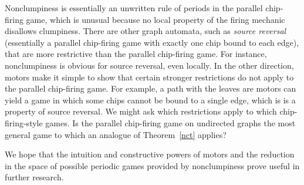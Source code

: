 Nonclumpiness is essentially an unwritten rule of periods in the parallel
chip-firing game, which is unusual because no local property of the firing
mechanic disallows clumpiness. There are other graph automata, such as
\emph{source reversal}~\cite{sourceReversal} (essentially a parallel
chip-firing game with exactly one chip bound to each edge), that are more
restrictive than the parallel chip-firing game. For instance, nonclumpiness is
obvious for source reversal, even locally. In the other direction, motors make
it simple to show that certain stronger restrictions do not apply to the
parallel chip-firing game. For example, a path with the leaves are motors can
yield a game in which some chips cannot be bound to a single edge, which is is
a property of source reversal. We might ask which restrictions apply to which
chip-firing-style games. Is the parallel chip-firing game on undirected graphs
the most general game to which an analogue of Theorem~\ref{nct} applies?

We hope that the intuition and constructive powers of motors and the reduction
in the space of possible periodic games provided by nonclumpiness prove useful
in further research. \FloatBarrier

